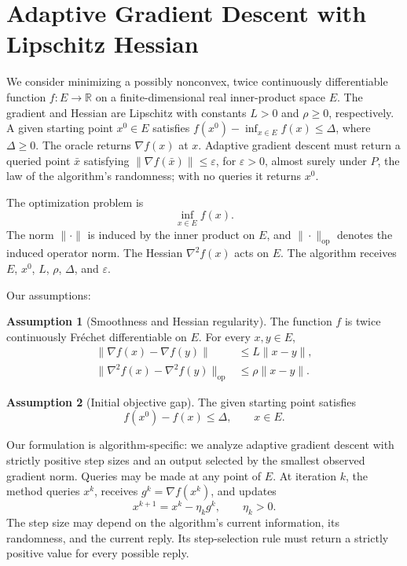 \documentclass[10pt]{article}
\theoremstyle{definition}
\newtheorem{assumption}{Assumption}
\begin{document}
\section*{Adaptive Gradient Descent with Lipschitz Hessian}
We consider minimizing a possibly nonconvex, twice continuously differentiable function $f:E\to\mathbb{R}$ on a finite-dimensional real inner-product space $E$. The gradient and Hessian are Lipschitz with constants $L>0$ and $\rho\geq0$, respectively. A given starting point $x^0\in E$ satisfies $f(x^0)-\inf_{x\in E}f(x)\leq\Delta$, where $\Delta\geq0$. The oracle returns $\nabla f(x)$ at $x$. Adaptive gradient descent must return a queried point $\bar{x}$ satisfying $\|\nabla f(\bar{x})\|\leq\varepsilon$, for $\varepsilon>0$, almost surely under $P$, the law of the algorithm's randomness; with no queries it returns $x^0$.

The optimization problem is
\[
\inf_{x\in E} f(x).
\]
The norm $\|\cdot\|$ is induced by the inner product on $E$, and $\|\cdot\|_{\mathrm{op}}$ denotes the induced operator norm. The Hessian $\nabla^2 f(x)$ acts on $E$. The algorithm receives $E$, $x^0$, $L$, $\rho$, $\Delta$, and $\varepsilon$.

Our assumptions:
\begin{assumption}[Smoothness and Hessian regularity]
The function $f$ is twice continuously Fr\'echet differentiable on $E$. For every $x,y\in E$,
\[
\begin{aligned}
\|\nabla f(x)-\nabla f(y)\|&\leq L\|x-y\|,\\
\|\nabla^2 f(x)-\nabla^2 f(y)\|_{\mathrm{op}}
&\leq \rho\|x-y\|.
\end{aligned}
\]
\end{assumption}

\begin{assumption}[Initial objective gap]
The given starting point satisfies
\[
f(x^0)-f(x)\leq\Delta,
\qquad x\in E.
\]
\end{assumption}

Our formulation is algorithm-specific: we analyze adaptive gradient descent with strictly positive step sizes and an output selected by the smallest observed gradient norm. Queries may be made at any point of $E$. At iteration $k$, the method queries $x^k$, receives $g^k=\nabla f(x^k)$, and updates
\[
x^{k+1}=x^k-\eta_k g^k,
\qquad \eta_k>0.
\]
The step size may depend on the algorithm's current information, its randomness, and the current reply. Its step-selection rule must return a strictly positive value for every possible reply.
\end{document}
